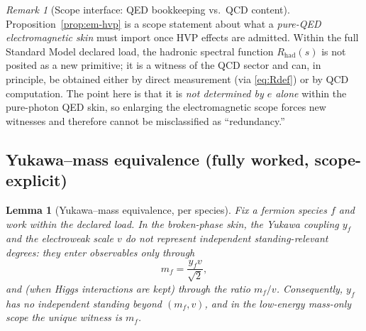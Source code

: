 \documentclass[11pt]{article}
\newtheorem{lemma}[definition]{Lemma}
\theoremstyle{remark}
\newtheorem{remark}[definition]{Remark}
\begin{document}
\begin{remark}[Scope interface: QED bookkeeping vs.\ QCD content]\label{rem:hvp-scope}
Proposition~\ref{prop:em-hvp} is a scope statement about what a \emph{pure-QED electromagnetic skin} must import once HVP effects are admitted.
Within the full Standard Model declared load, the hadronic spectral function $R_{\mathrm{had}}(s)$ is not posited as a new primitive; it is a witness of the QCD sector and can, in principle, be obtained either by direct measurement (via \eqref{eq:Rdef}) or by QCD computation.
The point here is that it is \emph{not determined by $e$ alone} within the pure-photon QED skin, so enlarging the electromagnetic scope forces new witnesses and therefore cannot be misclassified as ``redundancy.''
\end{remark}





\subsection{Yukawa--mass equivalence (fully worked, scope-explicit)}

\begin{lemma}[Yukawa--mass equivalence, per species]\label{lem:yukawa-mass}
Fix a fermion species $f$ and work within the declared load.
In the broken-phase skin, the Yukawa coupling $y_f$ and the electroweak scale $v$ do not represent
independent standing-relevant degrees: they enter observables only through
\begin{equation}\label{eq:mf}
m_f=\frac{y_f v}{\sqrt2},
\end{equation}
and (when Higgs interactions are kept) through the ratio $m_f/v$.
Consequently, $y_f$ has no independent standing beyond $(m_f,v)$, and in the low-energy \emph{mass-only}
scope the unique witness is $m_f$.
\end{lemma}
\end{document}
